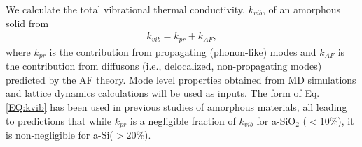 \documentclass[aps,prb,onecolumn,preprint,superscriptaddress,footinbib,amsmath,amssymb,floatfix]{revtex4}
\begin{document}
We calculate the total vibrational thermal conductivity, $k_{vib}$, 
of an amorphous solid from 
\begin{equation}\label{EQ:kvib}
\begin{split}
k_{vib} = k_{pr} + k_{AF},
\end{split}
\end{equation}
where $k_{pr}$ is the contribution from 
propagating (phonon-like) modes\cite{ashcroft_solid_1976,
dove_introduction_1993,ziman_electrons_2001} 
and $k_{AF}$ is the contribution 
from diffusons (i.e., delocalized, non-propagating modes) predicted 
by the AF theory.\cite{feldman_thermal_1993} Mode level 
properties obtained from MD simulations and lattice dynamics 
calculations will be used as inputs. 
The form of Eq. \eqref{EQ:kvib} has been used in 
previous studies of amorphous materials,
\cite{graebner_phonon_1986,freeman_thermal_1986,
love_estimate_1990,feldman_thermal_1993,cahill_thermal_1994,
feldman_numerical_1999,baldi_thermal_2008,
liu_high_2009,yang_anomalously_2010} 
all leading to predictions that while $k_{pr}$ is a negligible 
fraction of $k_{vib}$ for a-SiO$_2$ ($< 10\%$),
\cite{love_estimate_1990,baldi_thermal_2008} 
it is non-negligible 
for a-Si($> 20\%$).
\cite{feldman_thermal_1993,cahill_thermal_1994,
feldman_numerical_1999,liu_high_2009,yang_anomalously_2010,
he_heat_2011}
\end{document}
